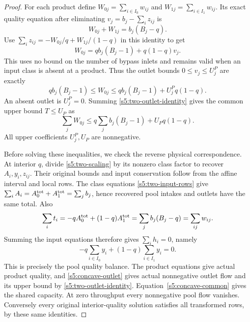 \begin{proof}
For each product define
$W_{0j}=\sum_{i\in I_0}w_{ij}$ and
$W_{1j}=\sum_{i\in I_1}w_{ij}$. Its exact quality equation after
eliminating $v_j=b_j-\sum_i z_{ij}$ is
\begin{equation}
 W_{0j}+W_{1j}=b_j(B_j-q).
 \label{s5:two-output}
\end{equation}
Use $\sum_i z_{ij}=-W_{0j}/q+W_{1j}/(1-q)$ in this identity to get
\begin{equation}
 W_{0j}=q b_j(B_j-1)+q(1-q)v_j.
 \label{s5:two-outlet-identity}
\end{equation}
This uses no bound on the number of bypass inlets and remains valid
when an input class is absent at a product. Thus the outlet bounds
$0\le v_j\le U_j^P$ are exactly
\begin{equation}
 q b_j(B_j-1)\le W_{0j}\le
        q b_j(B_j-1)+U_j^P q(1-q).
 \label{s5:concave-outlet}
\end{equation}
An absent outlet is $U_j^P=0$. Summing
\eqref{s5:two-outlet-identity} gives the common upper bound $T\le U_P$
as
\begin{equation}
 \sum_jW_{0j}\le q\sum_jb_j(B_j-1)+U_Pq(1-q).
 \label{s5:concave-common}
\end{equation}
All upper coefficients $U_j^P,U_P$ are nonnegative.

Before solving these inequalities, we check the reverse physical
correspondence. At interior $q$, divide \eqref{s5:two-scaling} by its
nonzero class factor to recover $A_i,y_i,z_{ij}$. Their original bounds
and input conservation follow from the affine interval and local rows.
The class equations \eqref{s5:two-input-rows} give
$\sum_i A_i=A_0^{\rm tot}+A_1^{\rm tot}=\sum_jb_j$, hence recovered
pool intakes and outlets have the same total. Also
\[
 \sum_i t_i=-q A_0^{\rm tot}+(1-q)A_1^{\rm tot}
       =\sum_jb_j(B_j-q)=\sum_{ij}w_{ij}.
\]
Summing the input equations therefore gives $\sum_i h_i=0$, namely
\[
 -q\sum_{i\in I_0}y_i+(1-q)\sum_{i\in I_1}y_i=0.
\]
This is precisely the pool quality balance. The product equations give
actual product quality, and \eqref{s5:concave-outlet} gives actual
nonnegative outlet flow and its upper bound by
\eqref{s5:two-outlet-identity}. Equation~\eqref{s5:concave-common}
gives the shared capacity. At zero throughput every nonnegative pool
flow vanishes. Conversely every original interior-quality solution
satisfies all transformed rows, by these same identities.


\end{proof}
